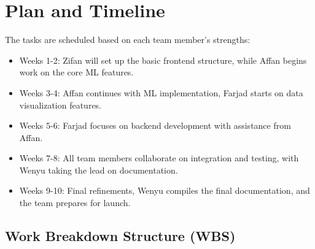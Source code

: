 \documentclass[12pt]{article}
\begin{document}
\section{Plan and Timeline}
The tasks are scheduled based on each team member's strengths:

\begin{itemize}
    \item Weeks 1-2: Zifan will set up the basic frontend structure, while Affan begins work on the core ML features.
    \item Weeks 3-4: Affan continues with ML implementation, Farjad starts on data visualization features.
    \item Weeks 5-6: Farjad focuses on backend development with assistance from Affan.
    \item Weeks 7-8: All team members collaborate on integration and testing, with Wenyu taking the lead on documentation.
    \item Weeks 9-10: Final refinements, Wenyu compiles the final documentation, and the team prepares for launch.
\end{itemize}


\subsection{Work Breakdown Structure (WBS)}
\end{document}
